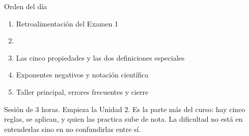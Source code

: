 \documentclass[aspectratio=169,10pt]{beamer}
\begin{document}
\portada

\begin{frame}{Orden del día}
  \begin{enumerate}
    \item Retroalimentación del Examen 1
    \item {}
    \item Las cinco propiedades y las dos definiciones especiales
    \item Exponentes negativos y notación científica
    \item Taller principal, errores frecuentes y cierre
  \end{enumerate}

  \vspace{0.25cm}
  {\footnotesize\color{uniGris} Sesión de 3 horas. Empieza la Unidad 2. Es la
  parte más  del curso: hay cinco reglas, se aplican, y
  quien las practica sube de nota. La dificultad no está en entenderlas sino
  en no confundirlas entre sí.}
\end{frame}

\end{document}

